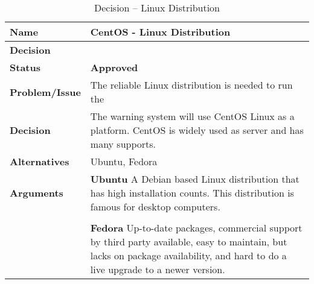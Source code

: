 \begin{table}[H]
	\begin{tabular}{L{0.2\textwidth} L{0.6\textwidth}}
		\textbf{Name} 			& \textbf{CentOS - Linux Distribution} \\ \toprule
		\textbf{Decision} 		&  \\ \midrule \midrule
		\textbf{Status} 		& \textbf{Approved} \\ \midrule
		\textbf{Problem/Issue} 	& The reliable Linux distribution is needed to run the \ProjectName{} \\ \midrule
		\textbf{Decision} 		&  The warning system will use CentOS Linux as a platform. CentOS is widely used as server and has many supports.\\ \midrule
		\textbf{Alternatives} 	& Ubuntu, Fedora \\ \midrule
		\textbf{Arguments} 		& 
		\textbf{Ubuntu} A Debian based Linux distribution that has high installation counts. This distribution is famous for desktop computers.\\\\
		& \textbf{Fedora} Up-to-date packages, commercial support by third party available, easy to maintain, but lacks on package availability, and hard to do a live upgrade to a newer version.
	\\ \bottomrule
	\end{tabular}
	\caption{Decision -- Linux Distribution}
	\label{table:linux}
\end{table}

